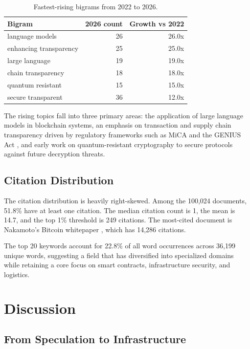 \documentclass[11pt]{article}
\begin{document}
\begin{table}[h]
\centering
\caption{Fastest-rising bigrams from 2022 to 2026.}
\label{tab:rising}
\begin{tabular}{lrr}
\toprule
Bigram & 2026 count & Growth vs 2022 \\
\midrule
language models & 26 & 26.0x \\
enhancing transparency & 25 & 25.0x \\
large language & 19 & 19.0x \\
chain transparency & 18 & 18.0x \\
quantum resistant & 15 & 15.0x \\
secure transparent & 36 & 12.0x \\
\bottomrule
\end{tabular}
\end{table}

The rising topics fall into three primary areas: the application of large language models in blockchain systems, an emphasis on transaction and supply chain transparency driven by regulatory frameworks such as MiCA \citep{eu2023mica} and the GENIUS Act \citep{us2025genius}, and early work on quantum-resistant cryptography \citep{merkle1987digital} to secure protocols against future decryption threats.

\subsection{Citation Distribution}

The citation distribution is heavily right-skewed. Among the 100,024 documents, 51.8\% have at least one citation. The median citation count is 1, the mean is 14.7, and the top 1\% threshold is 249 citations. The most-cited document is Nakamoto's Bitcoin whitepaper \citep{nakamoto2008bitcoin}, which has 14,286 citations.

The top 20 keywords account for 22.8\% of all word occurrences across 36,199 unique words, suggesting a field that has diversified into specialized domains while retaining a core focus on smart contracts, infrastructure security, and logistics.

\section{Discussion}
\label{sec:discussion}

\subsection{From Speculation to Infrastructure}
\end{document}
